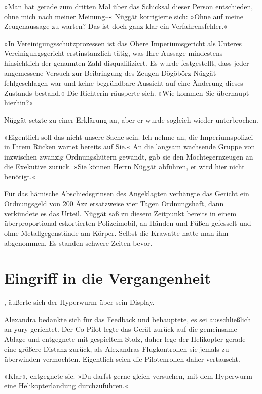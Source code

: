 »Man hat gerade zum dritten Mal über das Schicksal dieser Person entschieden, ohne mich nach meiner Meinung–« Nüggät korrigierte sich: »Ohne auf meine Zeugenaussage zu warten? Das ist doch ganz klar ein Verfahrensfehler.«

»In Vereinigungsschutzprozessen ist das Obere Imperiumsgericht als Unteres Vereinigungsgericht erstinstanzlich tätig, was Ihre Aussage mindestens hinsichtlich der genannten Zahl disqualifiziert. Es wurde festgestellt, dass jeder angemessene Versuch zur Beibringung des Zeugen Dögöbörz Nüggät fehlgeschlagen war und keine begründbare Aussicht auf eine Änderung dieses Zustands bestand.« Die Richterin räusperte sich. »Wie kommen Sie überhaupt hierhin?«

Nüggät setzte zu einer Erklärung an, aber er wurde sogleich wieder unterbrochen.

»Eigentlich soll das nicht unsere Sache sein. Ich nehme an, die Imperiumspolizei in Ihrem Rücken wartet bereits auf Sie.« An die langsam wachsende Gruppe von inzwischen zwanzig Ordnungshütern gewandt, gab sie den Möchtegernzeugen an die Exekutive zurück. »Sie können Herrn Nüggät abführen, er wird hier nicht benötigt.«

Für das hämische Abschiedsgrinsen des Angeklagten verhängte das Gericht ein Ordnungsgeld von 200 Äzz ersatzweise vier Tagen Ordnungshaft, dann verkündete es das Urteil. Nüggät saß zu diesem Zeitpunkt bereits in einem überproportional eskortierten Polizeimobil, an Händen und Füßen gefesselt und ohne Metallgegenstände am Körper. Selbst die Krawatte hatte man ihm abgenommen. Es standen schwere Zeiten bevor.


\chapter{Eingriff in die Vergangenheit}

, äußerte sich der Hyperwurm über sein Display. 

Alexandra bedankte sich für das Feedback und behauptete, es sei ausschließlich an yury gerichtet. Der Co-Pilot legte das Gerät zurück auf die gemeinsame Ablage und entgegnete mit gespieltem Stolz, daher lege der Helikopter gerade eine größere Distanz zurück, als Alexandras Flugkontrollen sie jemals zu überwinden vermochten. Eigentlich seien die Pilotenrollen daher vertauscht.

»Klar«, entgegnete sie. »Du darfst gerne gleich versuchen, mit dem Hyperwurm eine Helikopterlandung durchzuführen.«

